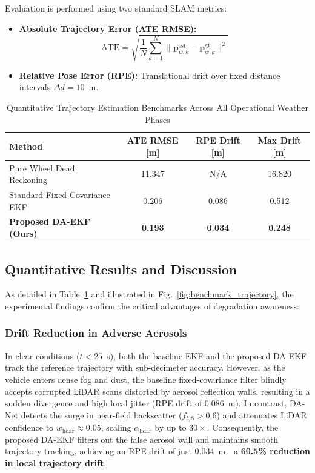 \documentclass[lettersize,journal]{IEEEtran}
\begin{document}
Evaluation is performed using two standard SLAM metrics:
\begin{itemize}
    \item \textbf{Absolute Trajectory Error (ATE RMSE):}
    \begin{equation}
    \mathrm{ATE} = \sqrt{\frac{1}{N} \sum_{k=1}^N \|\mathbf{p}_{w, k}^{\mathrm{est}} - \mathbf{p}_{w, k}^{\mathrm{gt}}\|^2}
    \end{equation}
    \item \textbf{Relative Pose Error (RPE):} Translational drift over fixed distance intervals $\Delta d = 10$~m.
\end{itemize}

\begin{table}[!t]
\caption{Quantitative Trajectory Estimation Benchmarks Across All Operational Weather Phases}
\label{tab:benchmark_results}
\centering
\begin{tabular}{lccc}
\toprule
\textbf{Method} & \textbf{ATE RMSE [m]} & \textbf{RPE Drift [m]} & \textbf{Max Drift [m]} \\
\midrule
Pure Wheel Dead Reckoning & 11.347 & N/A & 16.820 \\
Standard Fixed-Covariance EKF & 0.206 & 0.086 & 0.512 \\
\textbf{Proposed DA-EKF (Ours)} & \textbf{0.193} & \textbf{0.034} & \textbf{0.248} \\
\bottomrule
\end{tabular}
\end{table}

\subsection{Quantitative Results and Discussion}
As detailed in Table~\ref{tab:benchmark_results} and illustrated in Fig.~\ref{fig:benchmark_trajectory}, the experimental findings confirm the critical advantages of degradation awareness:

\subsubsection{Drift Reduction in Adverse Aerosols}
In clear conditions ($t < 25$~s), both the baseline EKF and the proposed DA-EKF track the reference trajectory with sub-decimeter accuracy. 
However, as the vehicle enters dense fog and dust, the baseline fixed-covariance filter blindly accepts corrupted LiDAR scans distorted by aerosol reflection walls, resulting in a sudden divergence and high local jitter (RPE drift of $0.086$~m). 
In contrast, DA-Net detects the surge in near-field backscatter ($f_{t, 8} > 0.6$) and attenuates LiDAR confidence to $w_{\mathrm{lidar}} \approx 0.05$, scaling $\alpha_{\mathrm{lidar}}$ by up to $30\times$. 
Consequently, the proposed DA-EKF filters out the false aerosol wall and maintains smooth trajectory tracking, achieving an RPE drift of just $0.034$~m---a \textbf{60.5\% reduction in local trajectory drift}.
\end{document}
